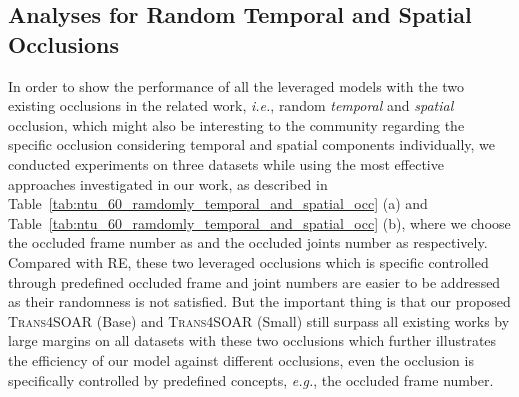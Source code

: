 \documentclass[lettersize,journal]{IEEEtran}
\begin{document}
\subsection{Analyses for Random Temporal and Spatial Occlusions}
In order to show the performance of all the leveraged models with the two existing occlusions in the related work, \textit{i.e.}, random \emph{temporal} and \emph{spatial} occlusion, which might also be interesting to the community regarding the specific occlusion considering temporal and spatial components individually, we conducted experiments on three datasets while using the most effective approaches investigated in our work, as described in Table~\ref{tab:ntu_60_ramdomly_temporal_and_spatial_occ} (a) and Table~\ref{tab:ntu_60_ramdomly_temporal_and_spatial_occ} (b), where we choose the occluded frame number as  and the occluded joints number as  respectively. Compared with RE, these two leveraged occlusions which is specific controlled through predefined occluded frame and joint numbers are easier to be addressed as their randomness is not satisfied. But the important thing is that our proposed \textsc{Trans4SOAR} (Base) and \textsc{Trans4SOAR} (Small) still surpass all existing works by large margins on all datasets with these two occlusions which further illustrates the efficiency of our model against different occlusions, even the occlusion is specifically controlled by predefined concepts, \textit{e.g.}, the occluded frame number.
\end{document}
